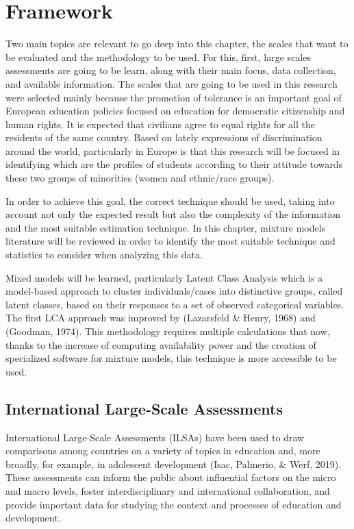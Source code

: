 \documentclass[12pt,a4paper,oneside]{reedthesis}
\begin{document}
\clearpage

\hypertarget{framework}{%
\chapter{Framework}\label{framework}}

Two main topics are relevant to go deep into this chapter, the scales that want to be evaluated and the methodology to be used. For this, first, large scales assessments are going to be learn, along with their main focus, data collection, and available information. The scales that are going to be used in this research were selected mainly because the promotion of tolerance is an important goal of European education policies focused on education for democratic citizenship and human rights. It is expected that civilians agree to equal rights for all the residents of the same country. Based on lately expressions of discrimination around the world, particularly in Europe is that this research will be focused in identifying which are the profiles of students according to their attitude towards these two groups of minorities (women and ethnic/race groups).

In order to achieve this goal, the correct technique should be used, taking into account not only the expected result but also the complexity of the information and the most suitable estimation technique. In this chapter, mixture models literature will be reviewed in order to identify the most suitable technique and statistics to consider when analyzing this data.

Mixed models will be learned, particularly Latent Class Analysis which is a model-based approach to cluster individuals/cases into distinctive groups, called latent classes, based on their responses to a set of observed categorical variables. The first LCA approach was improved by (Lazarsfeld \& Henry, 1968) and (Goodman, 1974). This methodology requires multiple calculations that now, thanks to the increase of computing availability power and the creation of specialized software for mixture models, this technique is more accessible to be used.

\hypertarget{international-large-scale-assessments}{%
\section{International Large-Scale Assessments}\label{international-large-scale-assessments}}

International Large-Scale Assessments (ILSAs) have been used to draw comparisons among countries on a variety of topics in education and, more broadly, for example, in adolescent development (Isac, Palmerio, \& Werf, 2019). These assessments can inform the public about influential factors on the micro and macro levels, foster interdisciplinary and international collaboration, and provide important data for studying the context and processes of education and development.
\end{document}
